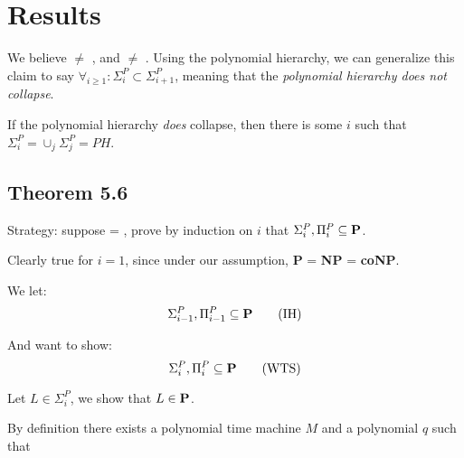 \documentclass[11pt]{article} %
\begin{document}
\section{Results}

We believe  $\neq$ , and  $\neq$ . Using the polynomial hierarchy, we can generalize this claim to say $\forall_{i \geq 1} : \Sigma_i^P \subset \Sigma_{i+1}^P$, meaning that the {\it polynomial hierarchy does not collapse}.

If the polynomial hierarchy {\it does} collapse, then there is some $i$ such that $\Sigma_i^P = \cup_j\Sigma_j^P = PH$.

\subsection{Theorem 5.6}

\vspace{4mm}
\midline

Strategy: suppose  = , prove by induction on $i$ that $\Sigma_i^P, \Pi_i^P \subseteq \text{{\bf P}}$.

 Clearly true for $i =1$, since under our assumption, {\bf P} = {\bf NP} = {\bf coNP}.


We let:
\begin{equation}
\Sigma_{i-1}^P, \Pi_{i-1}^P \subseteq \text{{\bf P}} \tag{IH}
\end{equation}

And want to show:
\begin{equation}
\Sigma_i^P, \Pi_i^P \subseteq \text{{\bf P}} \tag{WTS}
\end{equation}

Let $L \in \Sigma_i^P$, we show that $L \in \text{{\bf P}}$.

By definition there exists a polynomial time machine $M$ and a polynomial $q$ such that
\end{document}

